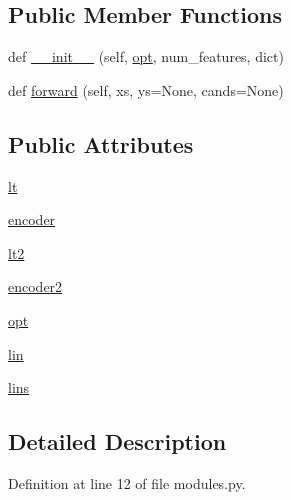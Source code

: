 \subsection*{Public Member Functions}
\begin{DoxyCompactItemize}
\item 
def \hyperlink{classparlai_1_1agents_1_1starspace_1_1modules_1_1Starspace_a28383f59fc45a0fa2193787aa2a8b188}{\+\_\+\+\_\+init\+\_\+\+\_\+} (self, \hyperlink{classparlai_1_1agents_1_1starspace_1_1modules_1_1Starspace_af1f3c22c7248018379df0379d253f8db}{opt}, num\+\_\+features, dict)
\item 
def \hyperlink{classparlai_1_1agents_1_1starspace_1_1modules_1_1Starspace_a08e4e81ef10c1ec4c09ab6c8147690ab}{forward} (self, xs, ys=None, cands=None)
\end{DoxyCompactItemize}
\subsection*{Public Attributes}
\begin{DoxyCompactItemize}
\item 
\hyperlink{classparlai_1_1agents_1_1starspace_1_1modules_1_1Starspace_abec90fc1b96357cb230a2b3118c9275f}{lt}
\item 
\hyperlink{classparlai_1_1agents_1_1starspace_1_1modules_1_1Starspace_aa93228651180a1901e55585fe9008002}{encoder}
\item 
\hyperlink{classparlai_1_1agents_1_1starspace_1_1modules_1_1Starspace_ae5bf28970ad7bd4207e8fe69986986fc}{lt2}
\item 
\hyperlink{classparlai_1_1agents_1_1starspace_1_1modules_1_1Starspace_a7ead99b8e725174d82e97bd014bd26c9}{encoder2}
\item 
\hyperlink{classparlai_1_1agents_1_1starspace_1_1modules_1_1Starspace_af1f3c22c7248018379df0379d253f8db}{opt}
\item 
\hyperlink{classparlai_1_1agents_1_1starspace_1_1modules_1_1Starspace_ab8e5d5eaf9aba2d98fdcf56dd5bf986d}{lin}
\item 
\hyperlink{classparlai_1_1agents_1_1starspace_1_1modules_1_1Starspace_a277328d66e566f3f9874e7af4402cef9}{lins}
\end{DoxyCompactItemize}


\subsection{Detailed Description}


Definition at line 12 of file modules.\+py.



